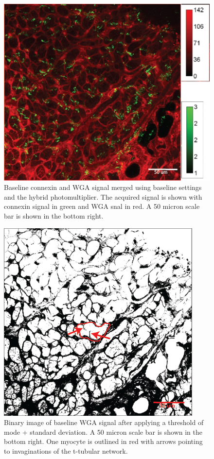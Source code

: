 \documentclass[12pt]{article}
\begin{document}
\begin{figure}[H]
	
		\centering
		\includegraphics[width=.95\textwidth]{FinalFigures/BaselineMerge.png}
		
	\caption{Baseline connexin and WGA signal merged using baseline settings and the hybrid photomultiplier. The acquired signal is shown with connexin signal in green and WGA snal in red. A 50 micron scale bar is shown in the bottom right.}
	\label{fig:base_merge}
\end{figure}

\begin{figure}[H]
	
	\centering
	\includegraphics[width=.95\textwidth]{FinalFigures/WGA_Baseline_Binary.png}
	
	\caption{Binary image of baseline WGA signal after applying a threshold of mode + standard deviation. A 50 micron scale bar is shown in the bottom right. One myocyte is outlined in red with arrows pointing to invaginations of the t-tubular network.}
	\label{fig:base_binary}
\end{figure}
\end{document}
